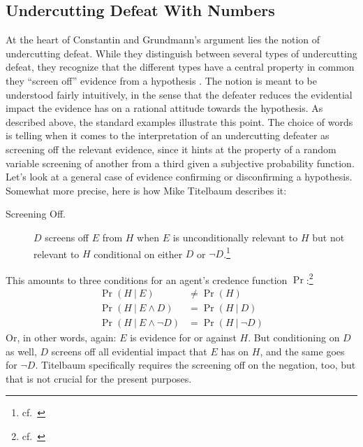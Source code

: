 \documentclass[11pt, a4paper]{scrartcl}
\newcommand{\given}[1][]{\:#1\vert\:}
\begin{document}
\subsection{Undercutting Defeat With Numbers}

At the heart of Constantin and Grundmann's argument lies the notion of undercutting defeat. While they distinguish between several types of undercutting defeat, they recognize that the different types have a central property in common they ``screen off'' evidence from a hypothesis \parencite[fn. 18]{Constantin2017}. The notion is meant to be understood fairly intuitively, in the sense that the defeater reduces the evidential impact the evidence has on a rational attitude towards the hypothesis. As described above, the standard examples illustrate this point. The choice of words is telling when it comes to the interpretation of an undercutting defeater as screening off the relevant evidence, since it hints at the property of a random variable screening of another from a third given a subjective probability function. Let's look at a general case of evidence confirming or disconfirming a hypothesis. Somewhat more precise, here is how Mike Titelbaum describes it:

\begin{description}
    \item[Screening Off.] $D$ screens off $E$ from $H$ when $E$ is unconditionally relevant to $H$ but not relevant to $H$ conditional on either $D$ or $\neg D$.\footnote{cf.\ \textcite[270]{Titelbaum2017}}
\end{description}

This amounts to three conditions for an agent's credence function $\Pr$:\footnote{cf.\ \textcite[70]{Titelbaum2017}}
\begin{align*}
    \Pr(H \given E) &\not = \Pr(H)\\
    \Pr(H \given E \land D) &= \Pr(H \given D)\\
    \Pr(H \given E \land \neg D) &= \Pr(H \given \neg D)
\end{align*} Or, in other words, again: $E$ is evidence for or against $H$. But conditioning on $D$ as well, $D$ screens off all evidential impact that $E$ has on $H$, and the same goes for $\neg D$. Titelbaum specifically requires the screening off on the negation, too, but that is not crucial for the present purposes.
\end{document}
